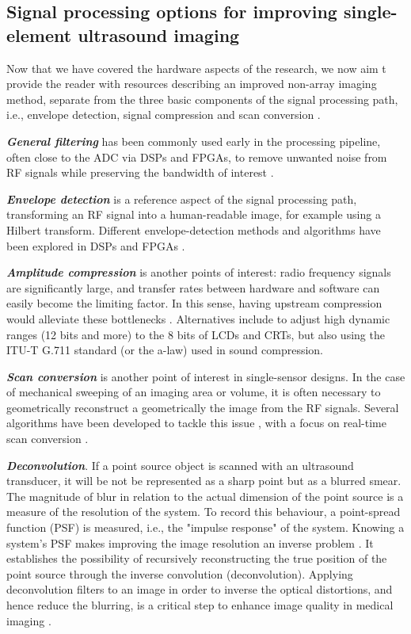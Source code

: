 \documentclass{article}
\begin{document}
\subsection{Signal processing options for improving single-element ultrasound imaging}
 
Now that we have covered the hardware aspects of the research, we now aim t provide the reader with resources describing an improved non-array imaging method, separate from the three basic components of the signal processing path, i.e., envelope detection, signal compression and scan conversion \cite{basoglu_computing_1998}.

\textbf{\textit{General filtering}} has been commonly used early in the processing pipeline, often close to the ADC via DSPs and FPGAs, to remove unwanted noise from RF signals while preserving the bandwidth of interest \cite{assef_modeling_2019, levesque_real-time_2009}.

\textbf{\textit{Envelope detection}} is a reference aspect  of the signal processing path, transforming an RF signal into a human-readable image, for example using a Hilbert transform. Different envelope-detection methods and algorithms have been explored in DSPs and FPGAs \cite{chang_novel_2007, assef_fpga_2019, assef_modeling_2018}.

\textbf{\textit{Amplitude compression}} is another points of interest: radio frequency signals are significantly large, and transfer rates between hardware and software can easily become the limiting factor. In this sense, having upstream compression would alleviate these bottlenecks \cite{soto-cajiga_fpga-based_2012, akkala_fpga_2014}. Alternatives \cite{akkala_compression_2014, boonleelakul_compression_2013} include  to adjust high dynamic ranges (12 bits and more) to the 8 bits of LCDs and CRTs, but also using the ITU-T G.711 standard (or the a-law) used in sound compression.

\textbf{\textit{Scan conversion}} is another point of interest in single-sensor designs. In the case of mechanical sweeping of an imaging area or volume, it is often necessary to geometrically reconstruct a geometrically the image from the RF signals. Several algorithms have been developed to tackle this issue \cite{ophir_digital_1979}, with a focus on real-time scan conversion  \cite{csany_real-time_2019}.

\textbf{\textit{Deconvolution}}. If a point source object is scanned with an ultrasound transducer, it will be not be represented as a sharp point but as a blurred smear. The magnitude of blur in relation to the actual dimension of the point source is a measure of the resolution of the system. To record this behaviour, a point-spread function (PSF) is measured, i.e., the "impulse response" of the system.  Knowing a system’s PSF makes improving the image resolution an inverse problem  \cite{jensen_deconvolution_1993,dalitz_point_2015}. It establishes the possibility of recursively reconstructing the true position of the point source through the inverse convolution (deconvolution). Applying deconvolution filters to an image in order to inverse the optical distortions, and hence reduce the blurring, is a critical step to enhance image quality in medical imaging \cite{dalitz_point_2015}.
\end{document}
